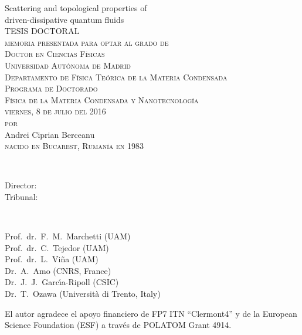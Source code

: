 \thispagestyle{empty}

\begin{center}
{\Huge  Scattering and topological properties of \\ driven-dissipative quantum fluids\\}
\vspace{5.4cm}
{\large{TESIS DOCTORAL}}\\
\vspace{2.6cm}
{ \textsc{memoria presentada para optar al grado de \\ Doctor en Ciencias F\'{i}sicas\\
Universidad Aut\'{o}noma de Madrid\\
Departamento de F\'{i}sica Te\'{o}rica de la Materia Condensada\\
Programa de Doctorado\\
F\'{i}sica de la Materia Condensada y Nanotecnolog\'{i}a\\
viernes, 8 de julio del 2016\\
$\,$\\$\,$\\por\\$\,$\\$\,$\\}
{\LARGE{Andrei Ciprian Berceanu}}\\$\,$ \\\textsc{nacido en Bucarest, Ruman\'{i}a en 1983}}
\end{center}
\newpage

\thispagestyle{empty}
\\[2ex]
  \parbox[t]{2.8cm}{Director:\\
                  Tribunal:
}~\parbox[t]{9cm}{Prof.\ dr.\ F.\ M.\ Marchetti (UAM) \\
Prof.\ dr.\ C.\ Tejedor (UAM) \\
Prof.\ dr.\ L.\ Vi\~{n}a (UAM) \\
Dr.\ A.\ Amo (CNRS, France) \\
Dr.\ J.\ J.\ Garc\'{\i}a-Ripoll (CSIC) \\
Dr.\ T.\ Ozawa (Universit\`{a} di Trento, Italy)
}


\vfill


\noindent
\begin{otherlanguage}{spanish}
El autor agradece el apoyo financiero de FP7 ITN ``Clermont4'' y
de la European Science Foundation (ESF) a trav\'{e}s de POLATOM Grant 4914.
\end{otherlanguage}
\vspace{\baselineskip}


